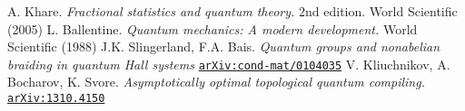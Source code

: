 \begin{thebibliography}{99}
   A. Khare. \textit{Fractional statistics and quantum theory.} 2nd edition. World Scientific (2005)
   L. Ballentine. \textit{Quantum mechanics: A modern development.} World Scientific (1988)
   J.K. Slingerland, F.A. Bais. \textit{Quantum groups and nonabelian braiding in quantum Hall systems} \href{https://arxiv.org/abs/cond-mat/0104035}{\texttt{arXiv:cond-mat/0104035}}
   V. Kliuchnikov, A. Bocharov, K. Svore. \textit{Asymptotically optimal topological quantum compiling.} \href{https://arxiv.org/abs/1310.4150}{\texttt{arXiv:1310.4150}}



\end{thebibliography}
